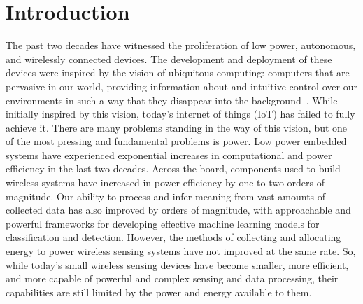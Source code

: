 \chapter{Introduction}
\label{chap:intro}

The past two decades have witnessed the proliferation of low power, autonomous, and wirelessly connected devices.
The development and deployment of these devices were inspired by the vision of ubiquitous computing: computers that are pervasive in our world, providing information about and intuitive control over our environments in such a way that they disappear into the background~\cite{weiser1991computer}.
While initially inspired by this vision, today's internet of things (IoT) has failed to fully achieve it.
There are many problems standing in the way of this vision, but one of the most pressing and fundamental problems is power.
Low power embedded systems have experienced exponential increases in computational and power efficiency in the last two decades. Across the board, components used to build wireless systems have increased in power efficiency by one to two orders of magnitude.
Our ability to process and infer meaning from vast amounts of collected data has also improved by orders of magnitude, with approachable and powerful frameworks for developing effective machine learning models for classification and detection.
However, the methods of collecting and allocating energy to power wireless sensing systems have not improved at the same rate.
So, while today's small wireless sensing devices have become smaller, more efficient, and more capable of powerful and complex sensing and data processing, their capabilities are still limited by the power and energy available to them. 

